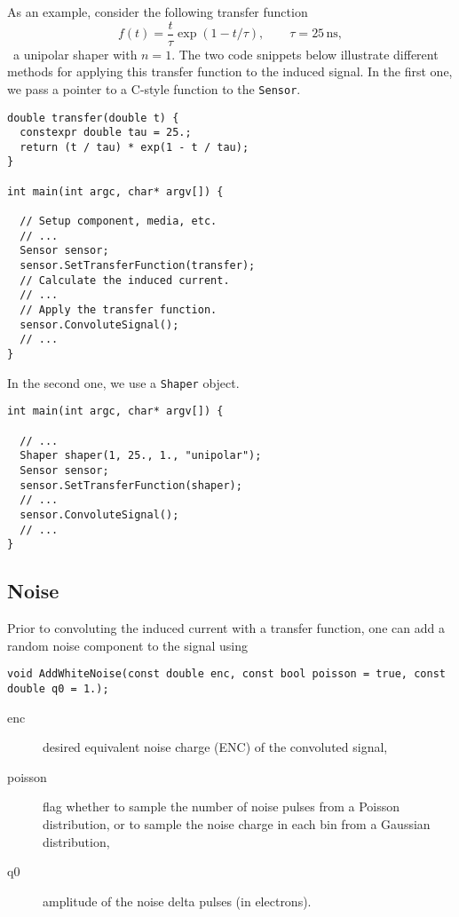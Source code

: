 As an example, consider the following transfer function
\begin{equation*}
  f\left(t\right) = \frac{t}{\tau}\exp\left(1 - t/\tau\right), \qquad
  \tau = 25\,\text{ns},
\end{equation*}
\ie~a unipolar shaper with $n = 1$. The two code snippets 
below illustrate different methods for applying this transfer function 
to the induced signal. In the first one, we pass a pointer to a 
C-style function to the \texttt{Sensor}.
\begin{lstlisting}
double transfer(double t) {
  constexpr double tau = 25.;
  return (t / tau) * exp(1 - t / tau);
}

int main(int argc, char* argv[]) {

  // Setup component, media, etc.
  // ...
  Sensor sensor;
  sensor.SetTransferFunction(transfer);
  // Calculate the induced current.
  // ...
  // Apply the transfer function.
  sensor.ConvoluteSignal();
  // ...
}
\end{lstlisting}

In the second one, we use a \texttt{Shaper} object.
\begin{lstlisting}
int main(int argc, char* argv[]) {

  // ...
  Shaper shaper(1, 25., 1., "unipolar");
  Sensor sensor;
  sensor.SetTransferFunction(shaper);
  // ...
  sensor.ConvoluteSignal();
  // ...
}
\end{lstlisting}

\subsection{Noise}
Prior to convoluting the induced current with a transfer function, 
one can add a random noise component to the signal using 
\begin{lstlisting}
void AddWhiteNoise(const double enc, const bool poisson = true, const double q0 = 1.);
\end{lstlisting}
\begin{description}
  \item[enc] desired equivalent noise charge (ENC) of the convoluted signal,
  \item[poisson] flag whether to sample the number of noise pulses 
    from a Poisson distribution, or to sample the noise charge in each 
    bin from a Gaussian distribution,
  \item[q0] amplitude of the noise delta pulses (in electrons). 
\end{description} 

